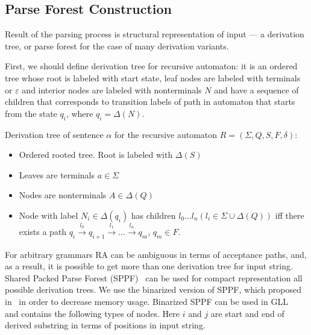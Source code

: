 \documentclass[runningheads,a4paper]{llncs}
\begin{document}
\subsection{Parse Forest Construction}

Result of the parsing process is structural representation of input --- a derivation tree, or parse forest for the case of many derivation variants.

First, we should define derivation tree for recursive automaton: it is an ordered tree whose root is labeled with start state,
leaf nodes are labeled with terminals or $\varepsilon$ and interior nodes are labeled with 
nonterminals $N$ and have a sequence of children that corresponds to transition labels of path in 
automaton that starts from the state $q_i$, where $q_i = \Delta(N)$.

\begin{mydef}

Derivation tree of sentence $\alpha$ for the recursive automaton $R=(\Sigma, Q, S, F, \delta)$:%

\begin{itemize}
\item Ordered rooted tree. Root is labeled with $\Delta(S)$
\item Leaves are terminals $a\in \Sigma$
\item Nodes are nonterminals $A\in \Delta(Q)$
\item Node with label $N_i \in \Delta(q_i)$ has children $l_0 \dots l_n (l_i \in \Sigma \cup \Delta(Q))$ iff there exists a
path
$q_i \xrightarrow[]{l_0} q_{i+1} \xrightarrow[]{l_1} \dots \xrightarrow{l_n} q_m$, $q_m \in F$. 
\end{itemize}

\end{mydef}

For arbitrary grammars RA can be ambiguous in terms of acceptance paths, and, as a result, it is possible to get more than one derivation tree for input string.
Shared Packed Parse Forest (SPPF)~\cite{SPPF} can be used for compact representation all possible derivation trees.
We use the binarized version of SPPF, which proposed in~\cite{brnglr} in order to decrease memory usage.
Binarized SPPF can be used in GLL~\cite{scott2013gll} and contains the following types of nodes.
Here $i$ and $j$ are start and end of derived substring in terms of positions in input string.
\end{document}
